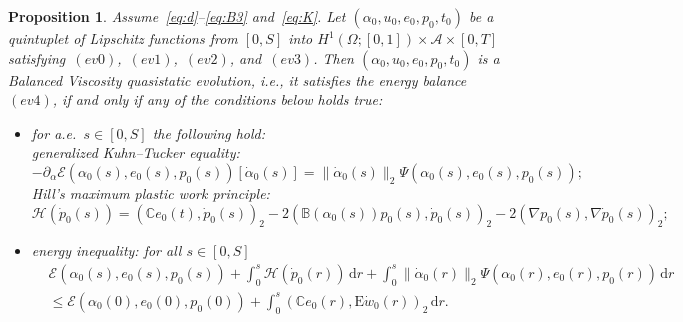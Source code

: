 \documentclass[reqno]{amsart}
\newtheorem{proposition}[corollary]{Proposition}
\theoremstyle{definition}
\numberwithin{equation}{section}
\def\de {\mathrm{d}}
\def\C {\mathbb C}
\def\B {\mathbb B}
\def\EE {\mathrm{E}}
\begin{document}
\begin{proposition}\label{prop:eq0}
Assume~\eqref{eq:d}--\eqref{eq:B3} and~\eqref{eq:K}. Let $(\alpha_0,u_0,e_0,p_0,t_0)$ be a quintuplet of Lipschitz functions from $[0,S]$ into $H^1(\Omega;[0,1])\times \mathcal A\times [0,T]$ satisfying~$(ev0)$,~$(ev1)$,~$(ev2)$, and~$(ev3)$. Then $(\alpha_0,u_0,e_0,p_0,t_0)$ is a Balanced Viscosity quasistatic evolution, i.e., it satisfies the energy balance~$(ev4)$, if and only if any of the conditions
below holds true:
\begin{itemize}
 \item[$(ev4')$] for a.e.\ $s\in[0,S]$ the following hold:\\
generalized Kuhn–Tucker equality: 
\begin{equation*}
-\partial_\alpha\mathcal E(\alpha_0(s),e_0(s),p_0(s))[\dot\alpha_0(s)]=\|\dot \alpha_0(s)\|_2\Psi(\alpha_0(s),e_0(s),p_0(s));
\end{equation*}
Hill’s maximum plastic work principle:
\begin{equation*}
\mathcal H(\dot p_0(s))=(\C e_0(t),\dot p_0(s))_2-2(\B(\alpha_0(s))p_0(s),\dot p_0(s))_2-2(\nabla p_0(s),\nabla \dot p_0(s))_2;
\end{equation*}
 \item[$(ev4'')$] energy inequality: for all $s\in[0,S]$
 \begin{align*}
 &\mathcal E(\alpha_0(s),e_0(s),p_0(s))+\int_0^s\mathcal H(\dot p_0(r)) \,\de r+\int_0^s\|\dot\alpha_0(r)\|_2\Psi(\alpha_0(r),e_0(r),p_0(r)) \,\de r\nonumber\\
 &\le\mathcal E(\alpha_0(0),e_0(0),p_0(0))+\int_0^s(\C e_0(r),\EE \dot w_0(r))_2 \,\de r.
 \end{align*}
\end{itemize}
\end{proposition}
\end{document}

